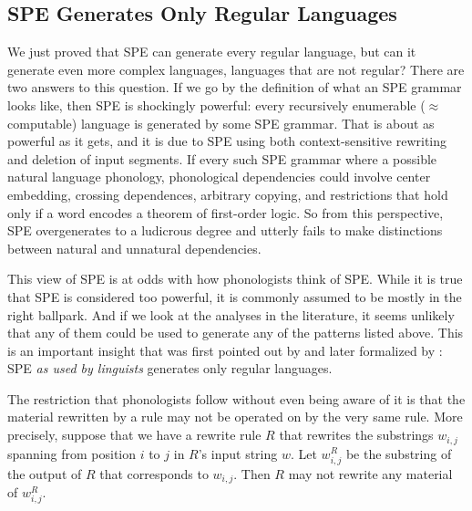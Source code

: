 \subsection{SPE Generates Only Regular Languages}

We just proved that SPE can generate every regular language, but can it generate even more complex languages, languages that are not regular?
There are two answers to this question.
If we go by the definition of what an SPE grammar looks like, then SPE is shockingly powerful: every recursively enumerable ($\approx$ computable) language is generated by some SPE grammar.
That is about as powerful as it gets, and it is due to SPE using both context-sensitive rewriting and deletion of input segments.
If every such SPE grammar where a possible natural language phonology, phonological dependencies could involve center embedding, crossing dependences, arbitrary copying, and restrictions that hold only if a word encodes a theorem of first-order logic.
So from this perspective, SPE overgenerates to a ludicrous degree and utterly fails to make distinctions between natural and unnatural dependencies.

This view of SPE is at odds with how phonologists think of SPE\@.
While it is true that SPE is considered too powerful, it is commonly assumed to be mostly in the right ballpark.
And if we look at the analyses in the literature, it seems unlikely that any of them could be used to generate any of the patterns listed above.
This is an important insight that was first pointed out by \citet{Johnson72} and later formalized by \citet{KaplanKay94}: SPE \emph{as used by linguists} generates only regular languages.

The restriction that phonologists follow without even being aware of it is that the material rewritten by a rule may not be operated on by the very same rule.
More precisely, suppose that we have a rewrite rule $R$ that rewrites the substrings $w_{i,j}$ spanning from position $i$ to $j$ in $R$'s input string $w$.
Let $w^R_{i,j}$ be the substring of the output of $R$ that corresponds to $w_{i,j}$.
Then $R$ may not rewrite any material of $w^R_{i,j}$.

